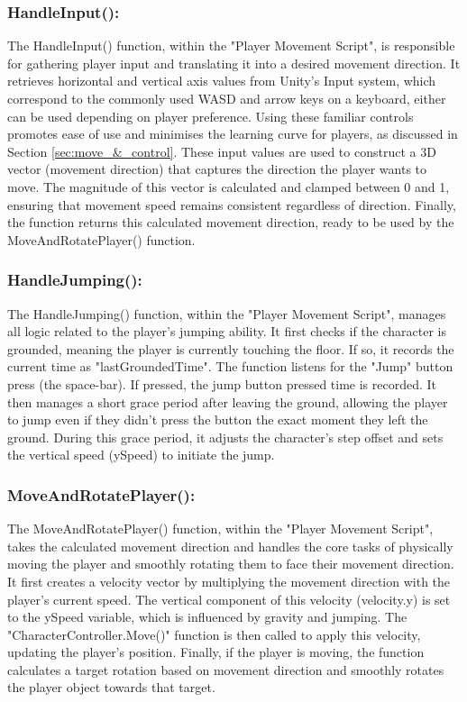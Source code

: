 \documentclass{l4proj}
\begin{document}
\subsubsection{HandleInput():}
The HandleInput() function, within the "Player Movement Script", is responsible for gathering player input and translating it into a desired movement direction. It retrieves horizontal and vertical axis values from Unity's Input system, which correspond to the commonly used WASD and arrow keys on a keyboard, either can be used depending on player preference. Using these familiar controls promotes ease of use and minimises the learning curve for players, as discussed in Section \ref{sec:move_&_control}. These input values are used to construct a 3D vector (movement direction) that captures the direction the player wants to move. The magnitude of this vector is calculated and clamped between 0 and 1, ensuring that movement speed remains consistent regardless of direction. Finally, the function returns this calculated movement direction, ready to be used by the MoveAndRotatePlayer() function.

\subsubsection{HandleJumping():}
The HandleJumping() function, within the "Player Movement Script", manages all logic related to the player's jumping ability. It first checks if the character is grounded, meaning the player is currently touching the floor. If so, it records the current time as "lastGroundedTime". The function listens for the "Jump" button press (the space-bar). If pressed, the jump button pressed time is recorded. It then manages a short grace period after leaving the ground, allowing the player to jump even if they didn't press the button the exact moment they left the ground. During this grace period, it adjusts the character's step offset and sets the vertical speed (ySpeed) to initiate the jump.

\subsubsection{MoveAndRotatePlayer():}
The MoveAndRotatePlayer() function, within the "Player Movement Script", takes the calculated movement direction and handles the core tasks of physically moving the player and smoothly rotating them to face their movement direction. It first creates a velocity vector by multiplying the movement direction with the player's current speed. The vertical component of this velocity (velocity.y) is set to the ySpeed variable, which is influenced by gravity and jumping. The "CharacterController.Move()" function is then called to apply this velocity, updating the player's position. Finally, if the player is moving, the function calculates a target rotation based on movement direction and smoothly rotates the player object towards that target.
\end{document}
